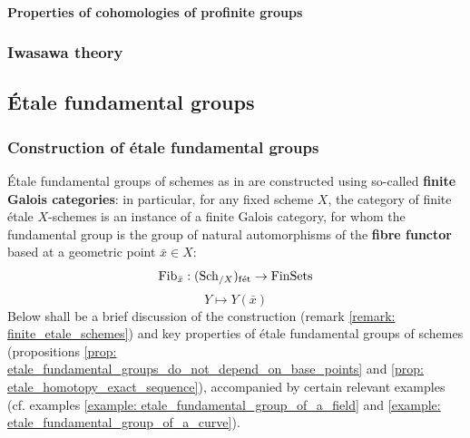                 \paragraph{Properties of cohomologies of profinite groups}
            
            \subsubsection{Iwasawa theory}
            
        \subsection{\'Etale fundamental groups}
            \subsubsection{Construction of \'etale fundamental groups}
                \'Etale fundamental groups of schemes as in \cite[Expos\'e V]{SGA1} are constructed using so-called \textbf{finite Galois categories}: in particular, for any fixed scheme $X$, the category of finite \'etale $X$-schemes is an instance of a finite Galois category, for whom the fundamental group is the group of natural automorphisms of the \textbf{fibre functor} based at a geometric point $\bar{x} \in X$:
                    $$\mathrm{Fib}_{\bar{x}}: (\mathrm{Sch}_{/X})_{\mathrm{f\acute{e}t}} \to \mathrm{Fin}\mathrm{Sets}$$
                    $$Y \mapsto Y(\bar{x})$$
                Below shall be a brief discussion of the construction (remark \ref{remark: finite_etale_schemes}) and key properties of \'etale fundamental groups of schemes (propositions \ref{prop: etale_fundamental_groups_do_not_depend_on_base_points} and \ref{prop: etale_homotopy_exact_sequence}), accompanied by certain relevant examples (cf. examples \ref{example: etale_fundamental_group_of_a_field} and \ref{example: etale_fundamental_group_of_a_curve}). 
                
